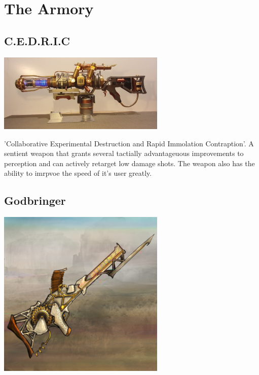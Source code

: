 \section{The Armory}

\vspace{5mm}

\subsection*{C.E.D.R.I.C} 

\begin{center}
\includegraphics[width=80mm]{./content/img/cedric.jpg}
\begin{figure}[h]
\end{figure}
\end{center}

\noindent 

'Collaborative Experimental Destruction and Rapid Immolation Contraption'.  A sentient weapon that grants several tactially advantageuous improvements to perception and can actively retarget low damage shots.  The weapon also has the ability to imrpvoe the speed of it's user greatly. 

\smallskip



\subsection*{Godbringer} 

\begin{center}
\includegraphics[width=80mm]{./content/img/godbringer.png}
\begin{figure}[h]
\end{figure}
\end{center}


